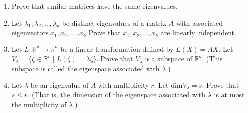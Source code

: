 \documentclass[12pt,letterpaper,boxed]{math_hw_pset}
\newcommand{\rr}{\mathbb{R}}
\newcommand{\<}{\left<}
\renewcommand{\>}{\right>}
\begin{document}
\newpage
\begin{exercise}[A7.]
    \begin{enumerate}
        \item Prove that similar matrices have the same eigenvalues. 
        \item Let $\lambda_1, \lambda_2, \dots, \lambda_k$ be distinct 
        eigenvalues 
        of a matrix $A$ with associated eigenvectors $x_1, x_2, \dots, x_k$ 
        Prove that $x_1, x_2, \dots, x_k$ are linearly independent. 
        \item Let $L: \rr^n \to \rr^n$ be a linear transformation defined
        by $L(X) = AX$. 
        Let $V_{\lambda} = \{\zeta \in \rr^n \mid L(\zeta) = \lambda\zeta\} 
        .$ Prove that $V_\lambda$ is a subspace of $\rr^n$. (This subspace 
        is called the eigenspace associated with $\lambda$.)

        \item Let $\lambda$ be an eigenvalue of $A$ with multiplicity $r$. 
        Let $\text{dim}V_{\lambda} = s$. Prove that $s \le r$. (That is, 
        the dimension of the eigenspace associated with $\lambda$ is at 
        most the multiplicity of $\lambda$.)

    \end{enumerate}
\end{exercise}
\end{document}
